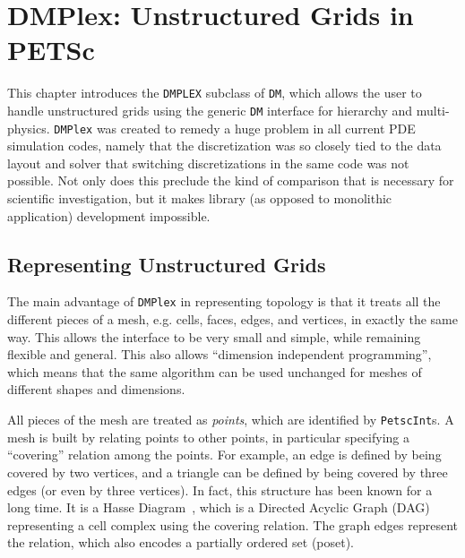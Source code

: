 \cleardoublepage
\chapter{DMPlex: Unstructured Grids in PETSc}
\label{ch_unstructured}

This chapter introduces the \lstinline{DMPLEX} subclass of \lstinline{DM}, which allows the user to handle unstructured grids using the generic
\lstinline{DM} interface for hierarchy and multi-physics. \lstinline{DMPlex} was created to remedy a huge problem in all current PDE
simulation codes, namely that the discretization was so closely tied to the data layout and solver that switching
discretizations in the same code was not possible. Not only does this preclude the kind of comparison that is necessary
for scientific investigation, but it makes library (as opposed to monolithic application) development impossible.

\medskip \medskip

\section{Representing Unstructured Grids} 

The main advantage of \lstinline{DMPlex} in representing topology is that it treats all the different pieces of a mesh,
e.g. cells, faces, edges, and vertices, in exactly the same way. This allows the interface to be very small and simple, while
remaining flexible and general. This also allows ``dimension independent programming'', which means that the same
algorithm can be used unchanged for meshes of different shapes and dimensions.

All pieces of the mesh are treated as \textit{points}, which are identified by \lstinline{PetscInt}s. A mesh is built by relating
points to other points, in particular specifying a ``covering'' relation among the points. For example, an edge is
defined by being covered by two vertices, and a triangle can be defined by being covered by three edges (or even by
three vertices). In fact, this structure has been known for a long time. It is a Hasse Diagram~\cite{HasseDiagram},
which is a Directed Acyclic Graph (DAG) representing a cell complex using the covering relation. The graph edges
represent the relation, which also encodes a partially ordered set (poset).

